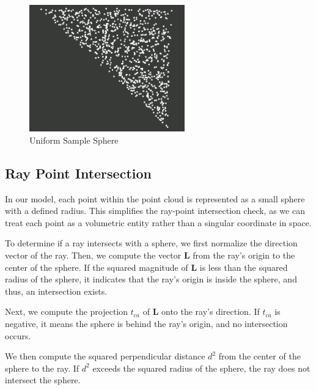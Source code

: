 \documentclass[11pt, a4paper,oneside,chapterprefix=false]{scrbook}
\begin{document}
\begin{minipage}{\textwidth}
	\begin{figure}[H]
		\centering
		\includegraphics*[width=0.6\textwidth]{figures/uniform sample triangle.png}
		\caption{Uniform Sample Sphere}
		\label{fig:uniform sample sphere}
	\end{figure}
\end{minipage}

\subsection{Ray Point Intersection}

In our model, each point within the point cloud is represented as a small sphere with a defined radius. This simplifies the ray-point intersection check, as we can treat each point as a volumetric entity rather than a singular coordinate in space.

\vspace{10pt}

To determine if a ray intersects with a sphere, we first normalize the direction vector of the ray. Then, we compute the vector \( \mathbf{L} \) from the ray's origin to the center of the sphere. If the squared magnitude of \( \mathbf{L} \) is less than the squared radius of the sphere, it indicates that the ray's origin is inside the sphere, and thus, an intersection exists.

\vspace{10pt}

Next, we compute the projection \( t_{ca} \) of \( \mathbf{L} \) onto the ray's direction. If \( t_{ca} \) is negative, it means the sphere is behind the ray's origin, and no intersection occurs.

\vspace{10pt}

We then compute the squared perpendicular distance \( d^2 \) from the center of the sphere to the ray. If \( d^2 \) exceeds the squared radius of the sphere, the ray does not intersect the sphere.
\end{document}
